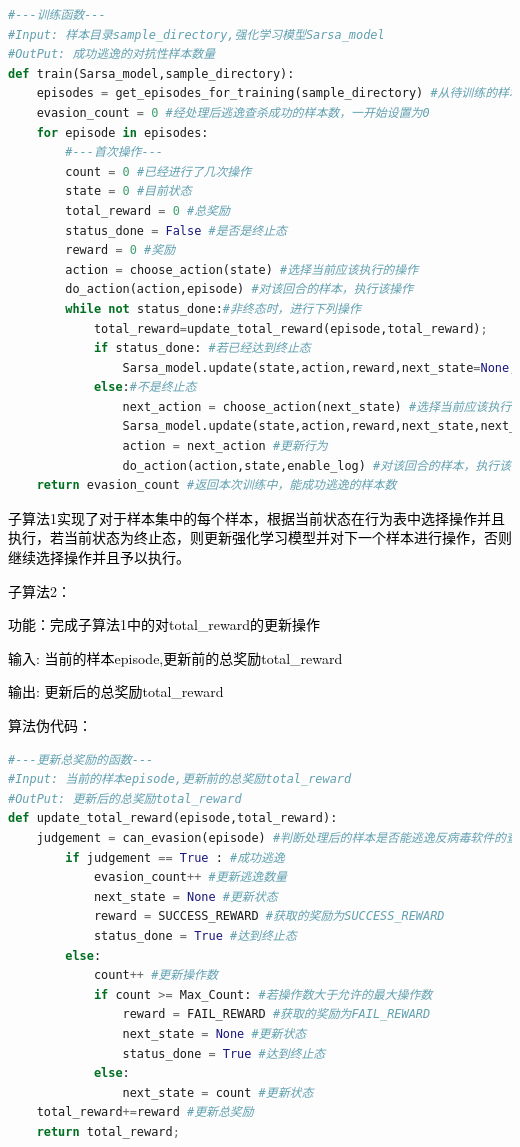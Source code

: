 \begin{lstlisting}[language=Python, caption={code for sub alogrithm 1}, label={lst:pythonfile2}]
#---训练函数---
#Input: 样本目录sample_directory,强化学习模型Sarsa_model 
#OutPut: 成功逃逸的对抗性样本数量
def train(Sarsa_model,sample_directory):
    episodes = get_episodes_for_training(sample_directory) #从待训练的样本集路径中获取所有待训练样本
    evasion_count = 0 #经处理后逃逸查杀成功的样本数，一开始设置为0
    for episode in episodes:
        #---首次操作---
        count = 0 #已经进行了几次操作
        state = 0 #目前状态
        total_reward = 0 #总奖励
        status_done = False #是否是终止态
        reward = 0 #奖励
        action = choose_action(state) #选择当前应该执行的操作
        do_action(action,episode) #对该回合的样本，执行该操作
        while not status_done:#非终态时，进行下列操作
            total_reward=update_total_reward(episode,total_reward);
            if status_done: #若已经达到终止态
                Sarsa_model.update(state,action,reward,next_state=None,next_action=None) #更新Sarsa强化学习模型
            else:#不是终止态
                next_action = choose_action(next_state) #选择当前应该执行的操作
                Sarsa_model.update(state,action,reward,next_state,next_action) #更新Sarsa强化学习模型
                action = next_action #更新行为
                do_action(action,state,enable_log) #对该回合的样本，执行该操作
    return evasion_count #返回本次训练中，能成功逃逸的样本数
\end{lstlisting}

\textcolor{black}{子算法1实现了对于样本集中的每个样本，根据当前状态在行为表中选择操作并且执行，若当前状态为终止态，则更新强化学习模型并对下一个样本进行操作，否则继续选择操作并且予以执行。}

\textcolor{black}{子算法2：}

\textcolor{black}{功能：完成子算法1中的对total\_reward的更新操作}

\textcolor{black}{输入: 当前的样本episode,更新前的总奖励total\_reward}

\textcolor{black}{输出: 更新后的总奖励total\_reward}

\textcolor{black}{算法伪代码：}

\begin{lstlisting}[language=Python, caption={code for sub alogrithm 2}, label={lst:pythonfile3}]
#---更新总奖励的函数---
#Input: 当前的样本episode,更新前的总奖励total_reward
#OutPut: 更新后的总奖励total_reward
def update_total_reward(episode,total_reward):
    judgement = can_evasion(episode) #判断处理后的样本是否能逃逸反病毒软件的查杀
        if judgement == True : #成功逃逸
            evasion_count++ #更新逃逸数量
            next_state = None #更新状态
            reward = SUCCESS_REWARD #获取的奖励为SUCCESS_REWARD
            status_done = True #达到终止态
        else:
            count++ #更新操作数
            if count >= Max_Count: #若操作数大于允许的最大操作数
                reward = FAIL_REWARD #获取的奖励为FAIL_REWARD
                next_state = None #更新状态
                status_done = True #达到终止态
            else:
                next_state = count #更新状态
    total_reward+=reward #更新总奖励
    return total_reward; 
\end{lstlisting}

